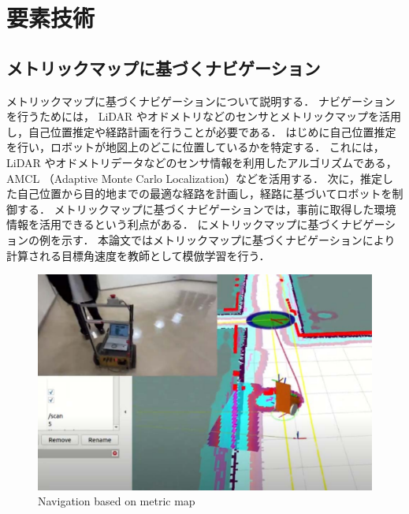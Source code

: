 \chapter{要素技術}
\section{メトリックマップに基づくナビゲーション}
メトリックマップに基づくナビゲーションについて説明する．
ナビゲーションを行うためには， LiDAR やオドメトリなどのセンサとメトリックマップを活用し，自己位置推定や経路計画を行うことが必要である．
はじめに自己位置推定を行い，ロボットが地図上のどこに位置しているかを特定する．
これには， LiDAR やオドメトリデータなどのセンサ情報を利用したアルゴリズムである， AMCL （Adaptive Monte Carlo Localization）などを活用する．
次に，推定した自己位置から目的地までの最適な経路を計画し，経路に基づいてロボットを制御する．
メトリックマップに基づくナビゲーションでは，事前に取得した環境情報を活用できるという利点がある．
にメトリックマップに基づくナビゲーションの例を示す．
本論文ではメトリックマップに基づくナビゲーションにより計算される目標角速度を教師として模倣学習を行う．

\begin{figure}[htbp]
  \centering
  \includegraphics[width=130mm]{images/pdf/other/nav.pdf}
  \caption{Navigation based on metric map}
  \label{fig:nav}
\end{figure}